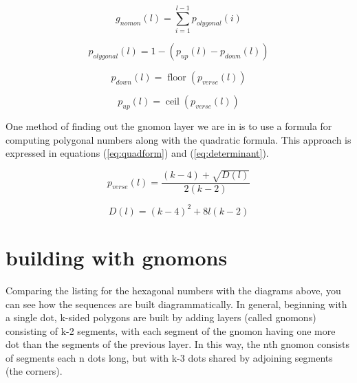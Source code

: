 \documentclass[notitlepage]{report}
\begin{document}
\begin{equation}
    g_{nomon}\left(l\right)=\sum_{i=1}^{l-1}p_{olygonal}\left(i\right)
\end{equation}

\begin{equation}
    p_{olygonal}\left(l\right)=1-\left(p_{up}\left(l\right)-p_{down}\left(l\right)\right)
\end{equation}

\begin{equation}
p_{down}\left(l\right)=\operatorname{floor}\left(p_{verse}\left(l\right)\right)
\end{equation}

\begin{equation}
p_{up}\left(l\right)=\operatorname{ceil}\left(p_{verse}\left(l\right)\right)
\end{equation}

One method of finding out the gnomon layer we are in is to use a formula for computing polygonal numbers along with the quadratic formula. This approach is expressed in equations (\ref{eq:quadform}) and (\ref{eq:determinant}).

\begin{equation}
    p_{verse}\left(l\right)=\frac{\left(k-4\right)+\sqrt{D\left(l\right)}}{2\left(k-2\right)}
     \label{eq:quadform}
\end{equation}

\begin{equation}
    D\left(l\right)=\left(k-4\right)^{2}+8l\left(k-2\right)
    \label{eq:determinant}
\end{equation}

\section{building with gnomons}

Comparing the listing for the hexagonal numbers with the diagrams above, you can see how the sequences are built diagrammatically. In general, beginning with a single dot, k-sided polygons are built by adding layers (called gnomons) consisting of k-2 segments, with each segment of the gnomon having one more dot than the segments of the previous layer. In this way, the nth gnomon consists of segments each n dots long, but with k-3 dots shared by adjoining segments (the corners).
\end{document}
